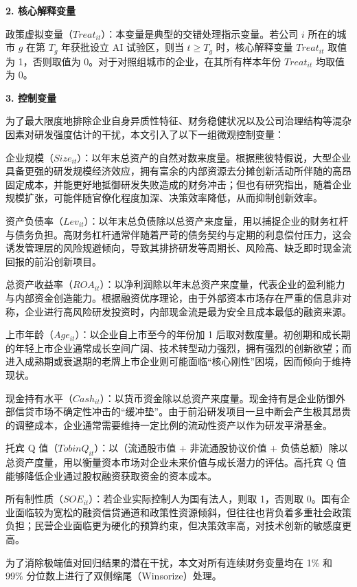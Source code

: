\documentclass[12pt,hyperref,a4paper,UTF8]{ctexart}
\begin{document}
\textbf{2. 核心解释变量}

政策虚拟变量（$Treat_{it}$）：本变量是典型的交错处理指示变量。若公司 $i$ 所在的城市 $g$ 在第 $T_g$ 年获批设立 AI 试验区，则当 $t \geq T_g$ 时，核心解释变量 $Treat_{it}$ 取值为 1，否则取值为 0。对于对照组城市的企业，在其所有样本年份 $Treat_{it}$ 均取值为 0。

\textbf{3. 控制变量}

为了最大限度地排除企业自身异质性特征、财务稳健状况以及公司治理结构等混杂因素对研发强度估计的干扰，本文引入了以下一组微观控制变量：

企业规模（$Size_{it}$）：以年末总资产的自然对数来度量。根据熊彼特假说，大型企业具备更强的研发规模经济效应，拥有富余的内部资源去分摊创新活动所伴随的高昂固定成本，并能更好地抵御研发失败造成的财务冲击；但也有研究指出，随着企业规模扩张，可能伴随官僚化程度加深、决策效率降低，从而抑制创新效率。

资产负债率（$Lev_{it}$）：以年末总负债除以总资产来度量，用以捕捉企业的财务杠杆与债务负担。高财务杠杆通常伴随着严苛的债务契约与定期的利息偿付压力，这会诱发管理层的风险规避倾向，导致其排挤研发等周期长、风险高、缺乏即时现金流回报的前沿创新项目。

总资产收益率（$ROA_{it}$）：以净利润除以年末总资产来度量，代表企业的盈利能力与内部资金创造能力。根据融资优序理论，由于外部资本市场存在严重的信息非对称，企业进行高风险研发投资时，内部现金流是最为安全且成本最低的融资来源。

上市年龄（$Age_{it}$）：以企业自上市至今的年份加 1 后取对数度量。初创期和成长期的年轻上市企业通常成长空间广阔、技术转型动力强烈，拥有强烈的创新欲望；而进入成熟期或衰退期的老牌上市企业则可能面临“核心刚性”困境，因而倾向于维持现状。

现金持有水平（$Cash_{it}$）：以货币资金除以总资产来度量。现金持有是企业防御外部信贷市场不确定性冲击的“缓冲垫”。由于前沿研发项目一旦中断会产生极其昂贵的调整成本，企业通常需要维持一定比例的流动性资产以作为研发平滑基金。

托宾 Q 值（$TobinQ_{it}$）：以（流通股市值 + 非流通股协议价值 + 负债总额）除以总资产度量，用以衡量资本市场对企业未来价值与成长潜力的评估。高托宾 Q 值能够降低企业通过股权融资获取资金的资本成本。

所有制性质（$SOE_{it}$）：若企业实际控制人为国有法人，则取 1，否则取 0。国有企业面临较为宽松的融资信贷通道和政策性资源倾斜，但往往也背负着多重社会政策负担；民营企业面临更为硬化的预算约束，但决策效率高，对技术创新的敏感度更高。

为了消除极端值对回归结果的潜在干扰，本文对所有连续财务变量均在 1\% 和 99\% 分位数上进行了双侧缩尾（Winsorize）处理。
\end{document}
